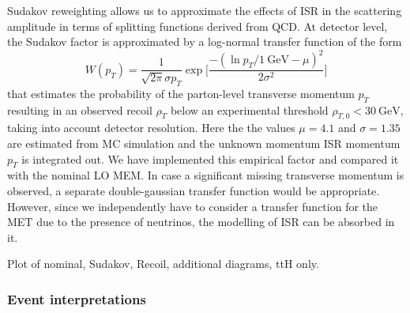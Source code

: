 Sudakov reweighting allows us to approximate the effects of ISR in the scattering amplitude in terms of splitting functions derived from QCD. At detector level, the Sudakov factor is approximated by a log-normal transfer function of the form
\begin{equation}
W(p_T) = \frac{1}{\sqrt{2\pi} \sigma p_T} \exp \biggl[ \frac{-(\ln{p_T/1~\mathrm{GeV}} - \mu)^2}{2\sigma^2}\biggr]
\end{equation}
that estimates the probability of the parton-level transverse momentum $p_T$ resulting in an observed recoil $\rho_T$ below an experimental threshold $\rho_{T,0} < 30~\mathrm{GeV}$, taking into account detector resolution. Here the the values $\mu = 4.1$ and $\sigma = 1.35$ are estimated from MC simulation and the unknown momentum ISR momentum $p_T$ is integrated out. We have implemented this empirical factor and compared it with the nominal LO MEM. In case a significant missing transverse momentum is observed, a separate double-gaussian transfer function would be appropriate. However, since we independently have to consider a transfer function for the MET due to the presence of neutrinos, the modelling of ISR can be absorbed in it.

\fix Plot of nominal, Sudakov, Recoil, additional diagrams, ttH only.

\subsubsection{Event interpretations}
\label{sec:event_interpretation}

